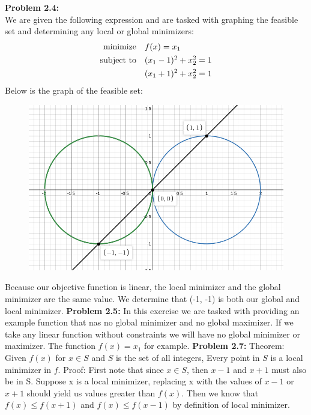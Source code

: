 \documentclass{article}
\begin{document}
 
\pagestyle{fancy}

\textbf{Problem 2.4:} \\
We are given the following expression and are tasked with graphing the feasible set and determining any local or global minimizers:
\begin{align*}
    \text{minimize} &\null \quad f(x) = x_1 \\
    \text{subject to} &\null \quad (x_1 - 1)^2 + x_2^2 = 1 \\ 
    &\null \quad (x_1+1)^2 + x_2^2 = 1
\end{align*}
Below is the graph of the feasible set:

\begin{figure}[H]
    \centering
    \includegraphics[scale = 0.40]{desmos1.png}
\end{figure}
Because our objective function is linear, the local minimizer and the global minimizer are the same value. We determine that (-1, -1) is both our global and local minimizer.
\break
\break
\textbf{Problem 2.5:} In this exercise we are tasked with providing an example function that nas no global minimizer and no global maximizer. If we take any linear function without constraints we will have no global minimizer or maximizer. The function $f(x) = x_1$ for example.
\break \break
\textbf{Problem 2.7:} Theorem: Given $f(x)$ for $x \in S$ and $S$ is the set of all integers, Every point in $S$ is a local minimizer in $f$.
\newline
Proof: First note that since $x \in S$, then $x-1$ and $x+1$ must also be in S.  Suppose x is a local minimizer, replacing x with the values of $x-1$ or $x+1$ should yield us values greater than $f(x)$. Then we know that $f(x) \leq f(x+1)$ and $f(x) \leq f(x-1)$ by definition of local minimizer. 
\end{document}
